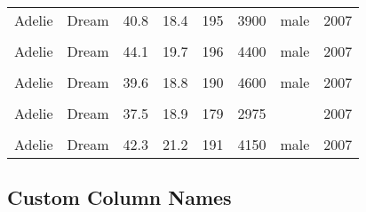 \documentclass[
  landscape]{article}
\begin{document}
\begin{longtable}[l]{llllllll}
Adelie & Dream & 40.8 & 18.4 & 195 & 3900 & male & 2007\\
\cellcolor{gray!15}{Adelie} & \cellcolor{gray!15}{Dream} & \cellcolor{gray!15}{36.0} & \cellcolor{gray!15}{18.5} & \cellcolor{gray!15}{186} & \cellcolor{gray!15}{3100} & \cellcolor{gray!15}{female} & \cellcolor{gray!15}{2007}\\
Adelie & Dream & 44.1 & 19.7 & 196 & 4400 & male & 2007\\
\cellcolor{gray!15}{Adelie} & \cellcolor{gray!15}{Dream} & \cellcolor{gray!15}{37.0} & \cellcolor{gray!15}{16.9} & \cellcolor{gray!15}{185} & \cellcolor{gray!15}{3000} & \cellcolor{gray!15}{female} & \cellcolor{gray!15}{2007}\\
Adelie & Dream & 39.6 & 18.8 & 190 & 4600 & male & 2007\\
\cellcolor{gray!15}{Adelie} & \cellcolor{gray!15}{Dream} & \cellcolor{gray!15}{41.1} & \cellcolor{gray!15}{19.0} & \cellcolor{gray!15}{182} & \cellcolor{gray!15}{3425} & \cellcolor{gray!15}{male} & \cellcolor{gray!15}{2007}\\
Adelie & Dream & 37.5 & 18.9 & 179 & 2975 &  & 2007\\
\cellcolor{gray!15}{Adelie} & \cellcolor{gray!15}{Dream} & \cellcolor{gray!15}{36.0} & \cellcolor{gray!15}{17.9} & \cellcolor{gray!15}{190} & \cellcolor{gray!15}{3450} & \cellcolor{gray!15}{female} & \cellcolor{gray!15}{2007}\\
Adelie & Dream & 42.3 & 21.2 & 191 & 4150 & male & 2007\\*
\end{longtable}

\hypertarget{custom-column-names}{%
\subsection{Custom Column Names}\label{custom-column-names}}
\end{document}
